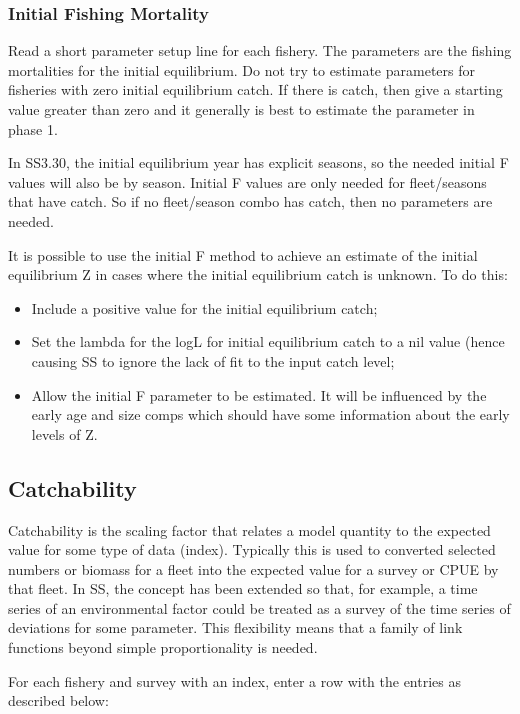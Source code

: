 \subsubsection{Initial Fishing Mortality}
Read a short parameter setup line for each fishery.  The parameters are the fishing mortalities for the initial equilibrium.  Do not try to estimate parameters for fisheries with zero initial equilibrium catch.  If there is catch, then give a starting value greater than zero and it generally is best to estimate the parameter in phase 1.

In SS3.30, the initial equilibrium year has explicit seasons, so the needed initial F values will also be by season.  Initial F values are only needed for fleet/seasons that have catch.  So if no fleet/season combo has catch, then no parameters are needed.

It is possible to use the initial F method to achieve an estimate of the initial equilibrium Z in cases where the initial equilibrium catch is unknown.  To do this:
\begin{itemize}
	\item Include a positive value for the initial equilibrium catch;
	\item Set the lambda for the logL for initial equilibrium catch to a nil value (hence causing SS to ignore the lack of fit to the input catch level;
	\item Allow the initial F parameter to be estimated.  It will be influenced by the early age and size comps which should have some information about the early levels of Z.
\end{itemize}

\hypertarget{Qsetup}{}
\subsection{Catchability}
Catchability is the scaling factor that relates a model quantity to the expected value for some type of data (index).  Typically this is used to converted selected numbers or biomass for a fleet into the expected value for a survey or CPUE by that fleet.  In SS, the concept has been extended so that, for example, a time series of an environmental factor could be treated as a survey of the time series of deviations for some parameter.  This flexibility means that a family of link functions beyond simple proportionality is needed.

For each fishery and survey with an index, enter a row with the entries as described below:

